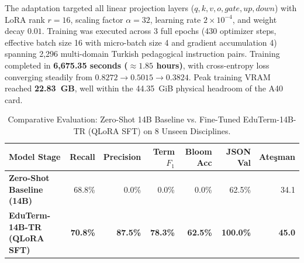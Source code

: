 \documentclass[a4paper,12pt]{report}
\begin{document}
The adaptation targeted all linear projection layers ($q, k, v, o, gate, up, down$) with LoRA rank $r=16$, scaling factor $\alpha=32$, learning rate $2 \times 10^{-4}$, and weight decay $0.01$. Training was executed across 3 full epochs (430 optimizer steps, effective batch size 16 with micro-batch size 4 and gradient accumulation 4) spanning 2,296 multi-domain Turkish pedagogical instruction pairs. Training completed in \textbf{6,675.35 seconds ($\approx 1.85$ hours)}, with cross-entropy loss converging steadily from $0.8272 \to 0.5015 \to 0.3824$. Peak training VRAM reached \textbf{22.83~GB}, well within the 44.35~GiB physical headroom of the A40 card.

\begin{table}[htbp]
\centering
\small
\caption{Comparative Evaluation: Zero-Shot 14B Baseline vs. Fine-Tuned EduTerm-14B-TR (QLoRA SFT) on 8 Unseen Disciplines.}
\label{tab:eduterm_14b_qlora}
\footnotesize\setlength{\tabcolsep}{3pt}
\begin{tabularx}{\textwidth}{>{\RaggedRight\arraybackslash}Xrrrrrr}
\toprule
\textbf{Model Stage} & \textbf{Recall} & \textbf{Precision} & \textbf{Term $F_1$} & \textbf{Bloom Acc} & \textbf{JSON Val} & \textbf{Ate\c{s}man} \\
\midrule
\textbf{Zero-Shot Baseline (14B)} & 68.8\% & 0.0\% & 0.0\% & 0.0\% & 62.5\% & 34.1 \\
\textbf{EduTerm-14B-TR (QLoRA SFT)} & \textbf{70.8\%} & \textbf{87.5\%} & \textbf{78.3\%} & \textbf{62.5\%} & \textbf{100.0\%} & \textbf{45.0} \\
\bottomrule
\end{tabularx}
\end{table}
\end{document}
